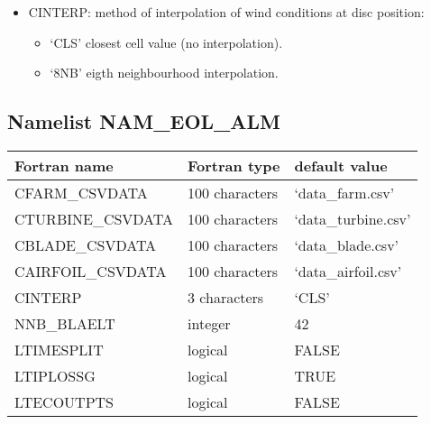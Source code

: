 \begin{itemize}
\item CINTERP: method of interpolation of wind conditions at disc position:
\begin{itemize}
\item `CLS' closest cell value (no interpolation).
\item `8NB' eigth neighbourhood interpolation.
\end{itemize}

\end{itemize}
\subsection{Namelist NAM\_EOL\_ALM}

\begin{center}
\begin{tabular} {|l|l|l|}
\hline
Fortran name & Fortran type & default value \\
\hline
CFARM\_CSVDATA      & 100 characters   & `data\_farm.csv' \\
CTURBINE\_CSVDATA   & 100 characters   & `data\_turbine.csv' \\
CBLADE\_CSVDATA     & 100 characters   & `data\_blade.csv' \\
CAIRFOIL\_CSVDATA   & 100 characters   & `data\_airfoil.csv' \\
CINTERP             & 3 characters     & `CLS' \\
NNB\_BLAELT         & integer          & 42 \\
LTIMESPLIT          & logical          & FALSE \\
LTIPLOSSG           & logical          & TRUE \\
LTECOUTPTS          & logical          & FALSE \\
\hline
\end{tabular}
\end{center}

